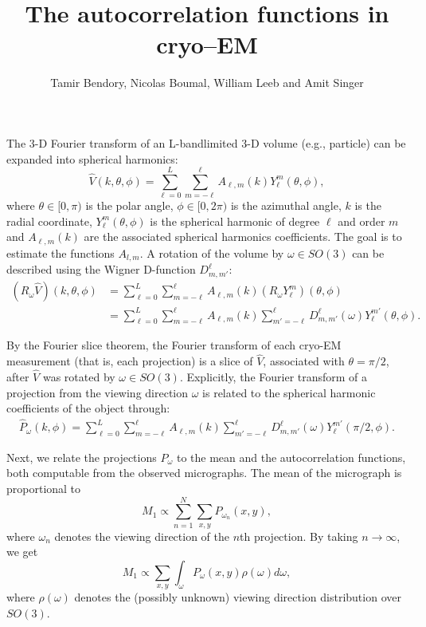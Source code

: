 \documentclass[english,11pt]{article}
\newcommand{\1}{\mathbf{1}}
\theoremstyle{plain}
\theoremstyle{definition}
\theoremstyle{remark}
\theoremstyle{plain}
\theoremstyle{remark}
\theoremstyle{plain}
\theoremstyle{plain}
\begin{document}
	
	\title{The autocorrelation functions in cryo--EM}
	
	
	\author{Tamir Bendory, Nicolas Boumal, William Leeb and Amit Singer}
	\maketitle



The 3-D Fourier transform of an L-bandlimited 3-D volume (e.g., particle) can be expanded into spherical harmonics:
\begin{equation} \label{eq:volume}
\hat{V}(k,\theta,\phi)  = \sum_{\ell=0}^{L} \sum_{m=-\ell}^{\ell} A_{\ell,m}(k)Y_\ell^{m}(\theta,\phi),
\end{equation}
where $\theta \in [0,\pi)$ is the polar angle, $\phi \in [0,2\pi)$ is the azimuthal angle, $k$ is the radial coordinate, $Y_{\ell}^m(\theta,\phi)$ is the spherical harmonic of degree $\ell$ and order $m$ and  $A_{\ell,m}(k)$ are the associated spherical harmonics coefficients. The goal is to estimate the functions $A_{l,m}$.
A rotation of the volume by $\omega\in SO(3)$ can be described using the Wigner D-function $D_{m,m'}^{\ell}$:
\begin{equation}
\begin{split}
(R_\omega \hat{V})(k,\theta,\phi)  &= \sum_{\ell=0}^{L} \sum_{m=-\ell}^{\ell} A_{\ell,m}(k)(R_\omega Y_\ell^{m})(\theta,\phi) \\
&= \sum_{\ell=0}^{L} \sum_{m=-\ell}^{\ell} A_{\ell,m}(k) 
\sum_{m'=-\ell}^{\ell}{D_{m,m'}^{\ell}(\omega)}Y_\ell^{m'}(\theta,\phi).
\end{split}
\end{equation}

By the Fourier slice theorem, the Fourier transform of each cryo-EM measurement (that is, each projection) is a slice of $\hat V$, associated with $\theta= \pi/2$, after $\hat{V}$ was rotated by $\omega\in SO(3)$. Explicitly, the Fourier transform of a projection from the viewing direction $\omega$ is related to the spherical harmonic coefficients of the object through:
\begin{equation} \label{eq:P}
\begin{split}
\hat P_\omega(k,\phi)  = \sum_{\ell=0}^{L} \sum_{m=-\ell}^{\ell} A_{\ell,m}(k) 
\sum_{m'=-\ell}^{\ell}{D_{m,m'}^{\ell}(\omega)}Y_\ell^{m'}(\pi/2,\phi).
\end{split}
\end{equation}

Next, we relate the projections $P_\omega$ to the mean and the autocorrelation functions, both computable from the observed micrographs.
The mean of the micrograph is proportional to 
\begin{equation}
M_1 \propto \sum_{n=1}^N \sum_{x,y}P_{\omega_n}(x,y),
\end{equation}
where $\omega_n$ denotes the viewing direction of the $n$th projection. By taking $n\to\infty$, we get  
\begin{equation}
M_1 \propto \sum_{x,y}\int_{\omega}P_\omega(x,y)\rho(\omega) d\omega,
\end{equation}
where $\rho(\omega)$ denotes the (possibly unknown) viewing direction distribution over $SO(3)$.
\end{document}
